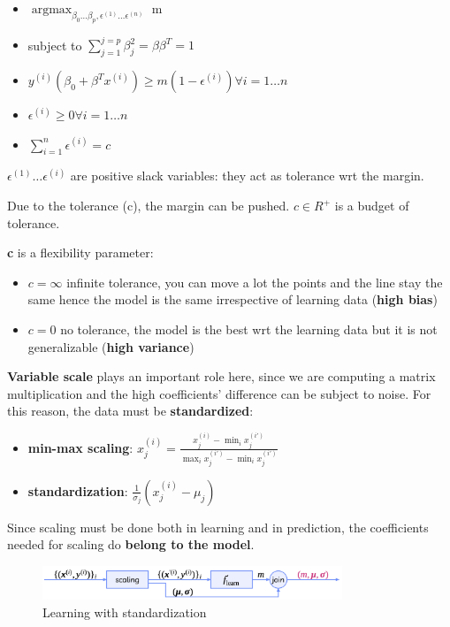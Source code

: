 \begin{definitionblock}
    \begin{itemize}
        \item $\operatorname*{argmax}_{\beta_0 \dots \beta_p, \epsilon^(1) \dots \epsilon^(n)}$ m 
        \item subject to $\sum_{j=1}^{j=p}\beta_j^2 = \beta \beta^T = 1$
        \item $y^{(i)}(\beta_0 + \beta^T x^{(i)}) \geq m(1 - \epsilon^{(i)}) \forall i = 1 \dots n$
        \item $\epsilon^{(i)} \geq 0 \forall i = 1 \dots n$
        \item $\sum_{i=1}^{n} \epsilon^{(i)} = c$
    \end{itemize}
    $\epsilon^{(1)} \dots \epsilon^{(i)}$ are positive slack variables: they act as tolerance wrt the margin.
    
    Due to the tolerance (c), the margin can be pushed. $c \in R^+$ is a budget of tolerance.
\end{definitionblock}

\textbf{c} is a flexibility parameter:
\begin{itemize}
    \item $c = \infty$ \to infinite tolerance, you can move a lot the points and the line stay the same hence the model is the same irrespective of learning data (\textbf{high bias})
    \item $c = 0$ \to no tolerance, the model is the best wrt the learning data but it is not generalizable (\textbf{high variance})
\end{itemize}

\textbf{Variable scale} plays an important role here, since we are computing a matrix multiplication and the high coefficients' difference can be subject to noise. For this reason, the data must be \textbf{standardized}:
\begin{itemize}
    \item \textbf{min-max scaling}: $x^{(i)}_j = \frac{x^{(i)}_j - \operatorname*{min}_i x^{(i')}_j}{\operatorname*{max}_i x^{(i')}_j - \operatorname*{min}_i x^{(i')}_j}$
    \item \textbf{standardization}: $\frac{1}{\sigma_j} (x^{(i)}_j - \mu_j)$
\end{itemize}

Since scaling must be done both in learning and in prediction, the coefficients needed for scaling do \textbf{belong to the model}.

\begin{figure}[H]
    \centering
    \includegraphics[width=0.8\textwidth]{assets/fig29.png}
    \caption{Learning with standardization}
\end{figure}


